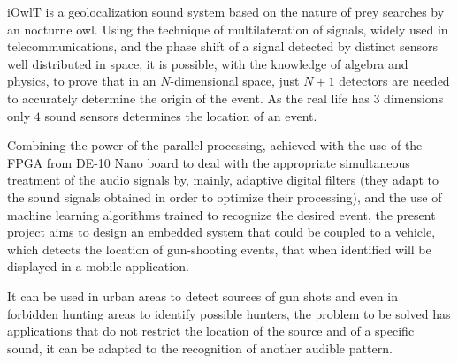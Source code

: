 \tab iOwlT is a geolocalization sound system based on the nature of prey searches by an nocturne owl. Using the technique of multilateration of signals, widely used in telecommunications, and the phase shift of a signal detected by distinct sensors well distributed in space, it is possible, with the knowledge of algebra and physics, to prove that in an $ N $-dimensional space, just $ N + 1 $ detectors are needed to accurately determine the origin of the event. As the real life has $ 3 $ dimensions only $4$ sound sensors determines the location of an event.

\tab Combining the power of the parallel processing, achieved with the use of the FPGA from DE-10 Nano board to deal with the appropriate simultaneous treatment of the audio signals by, mainly, adaptive digital filters (they adapt to the sound signals obtained in order to optimize their processing), and the use of machine learning algorithms trained to recognize the desired event, the present project aims to design an embedded system that could be coupled to a vehicle, which detects the location of gun-shooting events, that when identified will be displayed in a mobile application.

\tab It can be used in urban areas to detect sources of gun shots and even in forbidden hunting areas to identify possible hunters, the problem to be solved has applications that do not restrict the location of the source and of a specific sound, it can be adapted to the recognition of another audible pattern.
